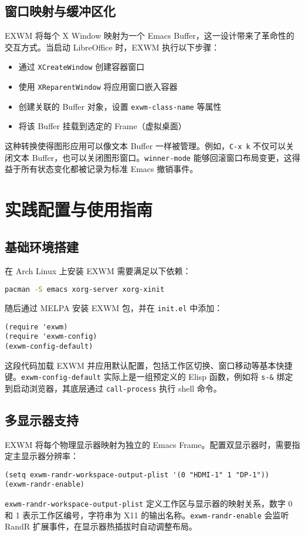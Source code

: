 \section{窗口映射与缓冲区化}
EXWM 将每个 X Window 映射为一个 Emacs Buffer，这一设计带来了革命性的交互方式。当启动 LibreOffice 时，EXWM 执行以下步骤：\par
\begin{itemize}
\item 通过 \verb!XCreateWindow! 创建容器窗口
\item 使用 \verb!XReparentWindow! 将应用窗口嵌入容器
\item 创建关联的 Buffer 对象，设置 \verb!exwm-class-name! 等属性
\item 将该 Buffer 挂载到选定的 Frame（虚拟桌面）
\end{itemize}
这种转换使得图形应用可以像文本 Buffer 一样被管理。例如，\verb!C-x k! 不仅可以关闭文本 Buffer，也可以关闭图形窗口。\verb!winner-mode! 能够回滚窗口布局变更，这得益于所有状态变化都被记录为标准 Emacs 撤销事件。\par
\chapter{实践配置与使用指南}
\section{基础环境搭建}
在 Arch Linux 上安装 EXWM 需要满足以下依赖：\par
\begin{lstlisting}[language=bash]
pacman -S emacs xorg-server xorg-xinit
\end{lstlisting}
随后通过 MELPA 安装 EXWM 包，并在 \verb!init.el! 中添加：\par
\begin{lstlisting}[language=elisp]
(require 'exwm)
(require 'exwm-config)
(exwm-config-default)
\end{lstlisting}
这段代码加载 EXWM 并应用默认配置，包括工作区切换、窗口移动等基本快捷键。\verb!exwm-config-default! 实际上是一组预定义的 Elisp 函数，例如将 \verb!s-&! 绑定到启动浏览器，其底层通过 \verb!call-process! 执行 shell 命令。\par
\section{多显示器支持}
EXWM 将每个物理显示器映射为独立的 Emacs Frame。配置双显示器时，需要指定主显示器分辨率：\par
\begin{lstlisting}[language=elisp]
(setq exwm-randr-workspace-output-plist '(0 "HDMI-1" 1 "DP-1"))
(exwm-randr-enable)
\end{lstlisting}
\verb!exwm-randr-workspace-output-plist! 定义工作区与显示器的映射关系，数字 0 和 1 表示工作区编号，字符串为 X11 的输出名称。\verb!exwm-randr-enable! 会监听 RandR 扩展事件，在显示器热插拔时自动调整布局。\par
